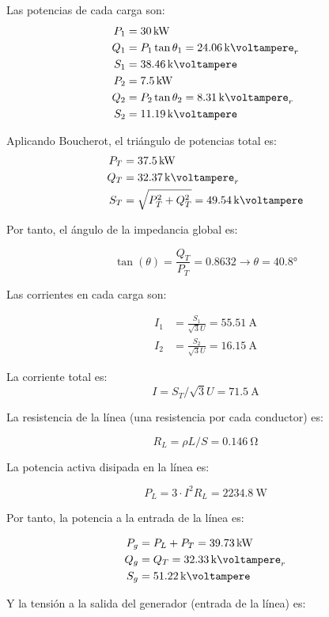 \documentclass[10pt]{article}
\begin{document}
Las potencias de cada carga son:
\begin{align*}
  P_1 &= \SI{30}{\kilo\watt}\\
  Q_1 &= P_1\tan \theta_1 = \SI{24.06}{\kilo\voltampere}_r\\
  S_1 &= \SI{38.46}{\kilo\voltampere}\\
  P_2 &= \SI{7.5}{\kilo\watt}\\
  Q_2 &= P_2 \tan \theta_2 = \SI{8.31}{\kilo\voltampere}_r\\
  S_2 &= \SI{11.19}{\kilo\voltampere}
\end{align*}

Aplicando Boucherot, el triángulo de potencias total es:
\begin{align*}
  P_T &= \SI{37.5}{\kilo\watt}\\
  Q_T &= \SI{32.37}{\kilo\voltampere}_r\\
  S_T &= \sqrt{P_T^2 + Q_T^2} = \SI{49.54}{\kilo\voltampere}
\end{align*}

Por tanto, el ángulo de la impedancia global es:

\[
  \tan(\theta) = \frac{Q_T}{P_T} = 0.8632 \rightarrow \theta =
  \ang{40.8}
\]

Las corrientes en cada carga son:

\begin{align*}
  I_1 &= \frac{S_1}{\sqrt{3} U} = \SI{55.51}{\ampere}\\
  I_2 &= \frac{S_2}{\sqrt{3} U} = \SI{16.15}{\ampere}
\end{align*}

La corriente total es:
\[
  I = S_T /{\sqrt{3} U} = \SI{71.5}{\ampere}
\]

La resistencia de la línea (una resistencia por cada conductor) es:

\[
  R_L = \rho L/S = \SI{0.146}{\ohm}
\]

La potencia activa disipada en la línea es:

\[
  P_L = 3 \cdot I^2 R_L = \SI{2234.8}{\watt}
\]

Por tanto, la potencia a la entrada de la línea es:

\begin{align*}
  P_g &= P_L + P_T = \SI{39.73}{\kilo\watt}\\
  Q_g &= Q_T = \SI{32.33}{\kilo\voltampere}_r\\
  S_g &= \SI{51.22}{\kilo\voltampere}
\end{align*}

Y la tensión a la salida del generador (entrada de la línea) es:
\end{document}
